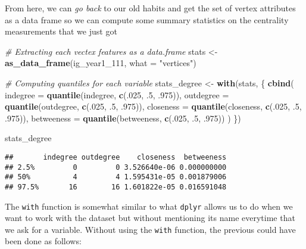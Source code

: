 \documentclass[]{book}
\newenvironment{Shaded}{\begin{snugshade}}{\end{snugshade}}
\newcommand{\KeywordTok}[1]{\textcolor[rgb]{0.13,0.29,0.53}{\textbf{#1}}}
\newcommand{\DataTypeTok}[1]{\textcolor[rgb]{0.13,0.29,0.53}{#1}}
\newcommand{\DecValTok}[1]{\textcolor[rgb]{0.00,0.00,0.81}{#1}}
\newcommand{\StringTok}[1]{\textcolor[rgb]{0.31,0.60,0.02}{#1}}
\newcommand{\CommentTok}[1]{\textcolor[rgb]{0.56,0.35,0.01}{\textit{#1}}}
\newcommand{\NormalTok}[1]{#1}
\theoremstyle{definition}
\theoremstyle{definition}
\theoremstyle{definition}
\theoremstyle{remark}
\begin{document}
From here, we can \emph{go back} to our old habits and get the set of
vertex attributes as a data frame so we can compute some summary
statistics on the centrality measurements that we just got

\begin{Shaded}
\begin{Highlighting}[]
\CommentTok{# Extracting each vectex features as a data.frame}
\NormalTok{stats <-}\StringTok{ }\KeywordTok{as_data_frame}\NormalTok{(ig_year1_}\DecValTok{111}\NormalTok{, }\DataTypeTok{what =} \StringTok{"vertices"}\NormalTok{)}

\CommentTok{# Computing quantiles for each variable}
\NormalTok{stats_degree <-}\StringTok{ }\KeywordTok{with}\NormalTok{(stats, \{}
 \KeywordTok{cbind}\NormalTok{(}
   \DataTypeTok{indegree   =} \KeywordTok{quantile}\NormalTok{(indegree, }\KeywordTok{c}\NormalTok{(.}\DecValTok{025}\NormalTok{, .}\DecValTok{5}\NormalTok{, .}\DecValTok{975}\NormalTok{)),}
   \DataTypeTok{outdegree  =} \KeywordTok{quantile}\NormalTok{(outdegree, }\KeywordTok{c}\NormalTok{(.}\DecValTok{025}\NormalTok{, .}\DecValTok{5}\NormalTok{, .}\DecValTok{975}\NormalTok{)),}
   \DataTypeTok{closeness  =} \KeywordTok{quantile}\NormalTok{(closeness, }\KeywordTok{c}\NormalTok{(.}\DecValTok{025}\NormalTok{, .}\DecValTok{5}\NormalTok{, .}\DecValTok{975}\NormalTok{)),}
   \DataTypeTok{betweeness =} \KeywordTok{quantile}\NormalTok{(betweeness, }\KeywordTok{c}\NormalTok{(.}\DecValTok{025}\NormalTok{, .}\DecValTok{5}\NormalTok{, .}\DecValTok{975}\NormalTok{))}
\NormalTok{ )}
\NormalTok{\})}

\NormalTok{stats_degree}
\end{Highlighting}
\end{Shaded}

\begin{verbatim}
##       indegree outdegree    closeness  betweeness
## 2.5%         0         0 3.526640e-06 0.000000000
## 50%          4         4 1.595431e-05 0.001879006
## 97.5%       16        16 1.601822e-05 0.016591048
\end{verbatim}

The \texttt{with} function is somewhat similar to what \texttt{dplyr}
allows us to do when we want to work with the dataset but without
mentioning its name everytime that we ask for a variable. Without using
the \texttt{with} function, the previous could have been done as
follows:
\end{document}
